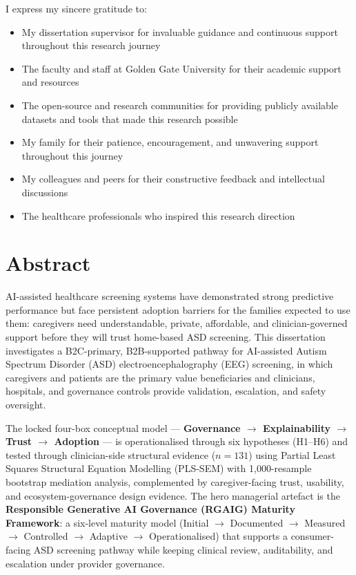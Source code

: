 \documentclass[12pt,a4paper,oneside]{report}
\begin{document}
I express my sincere gratitude to:

\begin{itemize}
    \item My dissertation supervisor for invaluable guidance and continuous support throughout this research journey
    \item The faculty and staff at Golden Gate University for their academic support and resources
    \item The open-source and research communities for providing publicly available datasets and tools that made this research possible
    \item My family for their patience, encouragement, and unwavering support throughout this journey
    \item My colleagues and peers for their constructive feedback and intellectual discussions
    \item The healthcare professionals who inspired this research direction
\end{itemize}

\chapter*{Abstract}

AI-assisted healthcare screening systems have demonstrated strong predictive performance but face persistent adoption barriers for the families expected to use them: caregivers need understandable, private, affordable, and clinician-governed support before they will trust home-based ASD screening. This dissertation investigates a B2C-primary, B2B-supported pathway for AI-assisted Autism Spectrum Disorder (ASD) electroencephalography (EEG) screening, in which caregivers and patients are the primary value beneficiaries and clinicians, hospitals, and governance controls provide validation, escalation, and safety oversight.

The locked four-box conceptual model --- \textbf{Governance $\to$ Explainability $\to$ Trust $\to$ Adoption} --- is operationalised through six hypotheses (H1--H6) and tested through clinician-side structural evidence ($n = 131$) using Partial Least Squares Structural Equation Modelling (PLS-SEM) with 1{,}000-resample bootstrap mediation analysis, complemented by caregiver-facing trust, usability, and ecosystem-governance design evidence. The hero managerial artefact is the \textbf{Responsible Generative AI Governance (RGAIG) Maturity Framework}: a six-level maturity model (Initial $\to$ Documented $\to$ Measured $\to$ Controlled $\to$ Adaptive $\to$ Operationalised) that supports a consumer-facing ASD screening pathway while keeping clinical review, auditability, and escalation under provider governance.
\end{document}
